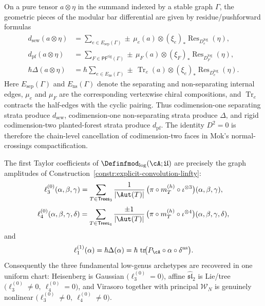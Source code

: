 \begin{construction}
\label{constr:boundary-operators-residue-correspondence}
On a pure tensor $a\otimes\eta$ in the summand indexed by a stable graph
$\Gamma$, the geometric pieces of the modular bar differential are given by
residue/pushforward formulas
\begin{align}
 d_{\mathrm{sew}}(a\otimes \eta)
 &=
 \sum_{e\in E_{\mathrm{sep}}(\Gamma)}
 \pm\,\mu_e(a)\otimes (\xi_e)_*\operatorname{Res}_{D_e^{\log}}(\eta),
 \label{eq:dsew-residue}\\
 d_{\mathrm{pf}}(a\otimes \eta)
 &=
 \sum_{F\in \mathsf{PF}^{\mathrm{rig}}(\Gamma)}
 \pm\,\mu_F(a)\otimes (\xi_F)_*\operatorname{Res}_{D_F^{\log}}(\eta),
 \label{eq:dpf-residue}\\
 \hbar\Delta(a\otimes \eta)
 &=
 \hbar\sum_{e\in E_{\mathrm{ns}}(\Gamma)}
 \pm\,\operatorname{Tr}_e(a)\otimes (\xi_e)_*\operatorname{Res}_{D_e^{\log}}(\eta).
 \label{eq:delta-residue}
\end{align}
Here $E_{\mathrm{sep}}(\Gamma)$ and $E_{\mathrm{ns}}(\Gamma)$ denote the
separating and non-separating internal edges, $\mu_e$ and $\mu_F$ are the
corresponding vertexwise chiral compositions, and $\operatorname{Tr}_e$
contracts the half-edges with the cyclic pairing.  Thus codimension-one
separating strata produce $d_{\mathrm{sew}}$, codimension-one
non-separating strata produce $\Delta$, and rigid codimension-two
planted-forest strata produce $d_{\mathrm{pf}}$.  The identity $D^2=0$ is
therefore the chain-level cancellation of codimension-two faces in Mok's
normal-crossings compactification.
\end{construction}

\begin{computation}
\label{comp:low-genus-log-fm-chart}
The first Taylor coefficients of
$\Definfmod_{\log}(\cA;\mathfrak U)$ are precisely the graph amplitudes of
Construction~\ref{constr:explicit-convolution-linfty}:
\[
\ell_3^{(0)}(\alpha,\beta,\gamma)
=
\sum_{T\in\mathsf{Trees}_3}
\frac{1}{|\Aut(T)|}\,
\bigl(\pi\circ m_T^{(h)}\circ \iota^{\otimes 3}\bigr)
(\alpha,\beta,\gamma),
\]
\[
\ell_4^{(0)}(\alpha,\beta,\gamma,\delta)
=
\sum_{T\in\mathsf{Trees}_4}
\frac{\pm1}{|\Aut(T)|}\,
\bigl(\pi\circ m_T^{(h)}\circ \iota^{\otimes 4}\bigr)
(\alpha,\beta,\gamma,\delta),
\]
and
\[
\ell_1^{(1)}(\alpha)
=
\hbar\Delta(\alpha)
=
\hbar\,\operatorname{tr}\!\bigl(
P_\cA\circ \alpha\circ \delta^{\mathrm{ns}}
\bigr).
\]
Consequently the three fundamental low-genus archetypes are recovered in one
uniform chart: Heisenberg is Gaussian
$\bigl(\ell_3^{(0)}=0\bigr)$, affine
$\widehat{\mathfrak{sl}}_2$ is Lie/tree
$\bigl(\ell_3^{(0)}\neq0,\ \ell_4^{(0)}=0\bigr)$, and Virasoro together
with principal $\mathcal W_N$ is genuinely nonlinear
$\bigl(\ell_3^{(0)}\neq0,\ \ell_4^{(0)}\neq0\bigr)$.
\end{computation}

